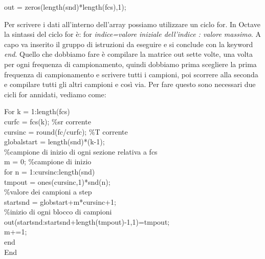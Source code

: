 \documentclass[11pt]{article}
\begin{document}
\begin{multicols*}{2}
\vspace{0.3cm}

\begin{center}
\begin{minipage}[c]{7cm}
\begin{sffamily}

out = zeros(length(snd)*length(fcs),1);  \\

\end{sffamily}
\end{minipage}
\end{center}

\noindent Per scrivere i dati all’interno dell’array possiamo utilizzare un ciclo for. In Octave la sintassi del ciclo for è: for \textit {indice=valore iniziale dell’indice : valore massimo}. A capo va inserito il gruppo di istruzioni da eseguire e si conclude con la keyword \textit {end}. Quello che dobbiamo fare è compilare la matrice out sette volte, una volta per ogni frequenza di campionamento, quindi dobbiamo prima scegliere la prima frequenza di campionamento e scrivere tutti i campioni, poi scorrere alla seconda e compilare tutti gli altri campioni e così via. Per fare questo sono necessari due cicli for annidati, vediamo come:

\begin{center}
\begin{minipage}[c]{8cm}
\begin{sffamily}


For k = 1:length(fcs)\\
	curfc = fcs(k); \%sr corrente\\
	cursinc = round(fc/curfc); \%T corrente\\
	globalstart = length(snd)*(k-1);\\
	\%campione di inizio di ogni sezione relativa a fcs\\
	m = 0; \%campione di inizio\\
	for n = 1:cursinc:length(snd)\\
		tmpout = ones(cursinc,1)*snd(n);\\
		\%valore dei campioni a step\\
		startsnd = globstart+m*cursinc+1;\\
		\%inizio di ogni blocco di campioni\\
		out(startsnd:startsnd+length(tmpout)-1,1)=tmpout;\\
		m+=1;\\
	end\\
End\\


\end{sffamily}
\end{minipage}
\end{center}
\end{multicols*}
\end{document}
